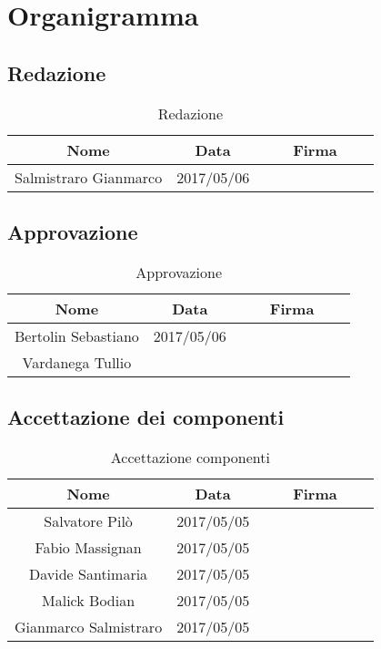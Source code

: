 \section{Organigramma}
	\subsection{Redazione}
	\begin{table}[H]
		\centering
		\begin{tabular}{|c|c|ccccc|}
			\hline
			\textbf{Nome}		& \textbf{Data}	&	&	& \textbf{Firma}	&	& \\
			\hline
			Salmistraro Gianmarco	& 		2017/05/06		&     &     &     &     & \\
			\hline
		\end{tabular}
		\caption{Redazione}
	\end{table}
	\subsection{Approvazione}
	\begin{table}[H]
		\centering
		\begin{tabular}{|c|c|ccccc|}
			\hline
			\textbf{Nome}		& \textbf{Data}	&	&	& \textbf{Firma}	&	& \\
			\hline
			Bertolin Sebastiano	& 		2017/05/06		&     &     &     &     & \\
			Vardanega Tullio	& 				&     &     &     &     & \\
			\hline
		\end{tabular}
		\caption{Approvazione}
	\end{table}
	\subsection{Accettazione dei componenti}
	\begin{table}[H]
		\centering
		\begin{tabular}{|c|c|ccccc|}
			\hline
			\textbf{Nome}		& \textbf{Data}	&	&	& \textbf{Firma}	&	& \\
			\hline
			Salvatore Pilò			& 	2017/05/05	&     &     &     &     & \\
			Fabio Massignan			&	2017/05/05	&     &     &     &     & \\
			Davide Santimaria		&	2017/05/05	&     &     &     &     & \\
			Malick Bodian			& 	2017/05/05	&     &     &     &     & \\
			Gianmarco Salmistraro	&	2017/05/05	&     &     &     &     & \\
			\hline
		\end{tabular}
		\caption{Accettazione componenti}
	\end{table}
